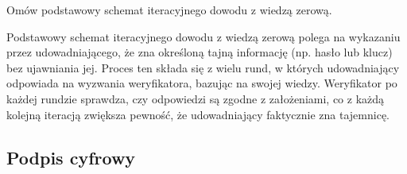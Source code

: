 \documentclass[answers,11pt]{exam}
\begin{document}
\begin{questions}
\question Omów podstawowy schemat iteracyjnego dowodu z wiedzą zerową.

\begin{solution}
Podstawowy schemat iteracyjnego dowodu z wiedzą zerową polega na wykazaniu przez udowadniającego, że zna określoną tajną informację (np. hasło lub klucz) bez ujawniania jej. Proces ten składa się z wielu rund, w których udowadniający odpowiada na wyzwania weryfikatora, bazując na swojej wiedzy. Weryfikator po każdej rundzie sprawdza, czy odpowiedzi są zgodne z założeniami, co z każdą kolejną iteracją zwiększa pewność, że udowadniający faktycznie zna tajemnicę. 
\end{solution}

\end{questions}


\subsection{Podpis cyfrowy}
\end{document}
